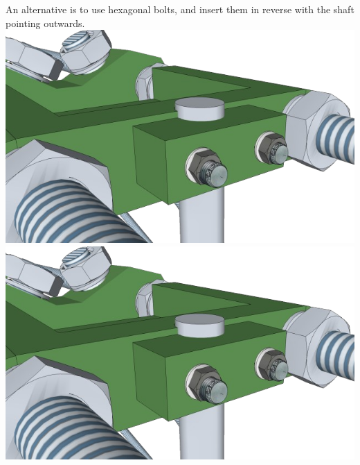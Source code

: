 \documentclass[twoside,openany,a4paper,titlepage]{memoir}
\begin{document}
	An alternative is to use hexagonal bolts, and insert them in reverse with the shaft pointing outwards.\\
	\includegraphics[width=1\linewidth]{graphics/ch8_5_4.png}
	\includegraphics[width=1\linewidth]{graphics/ch8_5_5.png}
	
\end{document}
